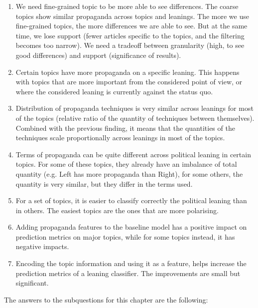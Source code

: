 \begin{enumerate}
    \item We need fine-grained topic to be more able to see differences. The coarse topics show similar propaganda across topics and leanings. The more we use fine-grained topics, the more differences we are able to see. But at the same time, we lose support (fewer articles specific to the topics, and the filtering becomes too narrow). We need a tradeoff between granularity (high, to see good differences) and support (significance of results).
    \item Certain topics have more propaganda on a specific leaning. This happens with topics that are more important from the considered point of view, or where the considered leaning is currently against the status quo.
    \item Distribution of propaganda techniques is very similar across leanings for most of the topics (relative ratio of the quantity of techniques between themselves). Combined with the previous finding, it means that the quantities of the techniques scale proportionally across leanings in most of the topics.
    \item Terms of propaganda can be quite different across political leaning in certain topics. For some of these topics, they already have an imbalance of total quantity (e.g. Left has more propaganda than Right), for some others, the quantity is very similar, but they differ in the terms used.
    \item For a set of topics, it is easier to classify correctly the political leaning than in others. The easiest topics are the ones that are more polarising.
    \item Adding propaganda features to the baseline model has a positive impact on prediction metrics on major topics, while for some topics instead, it has negative impacts.
    \item Encoding the topic information and using it as a feature, helps increase the prediction metrics of a leaning classifier. The improvements are small but significant.
\end{enumerate}


The answers to the subquestions for this chapter are the following:


